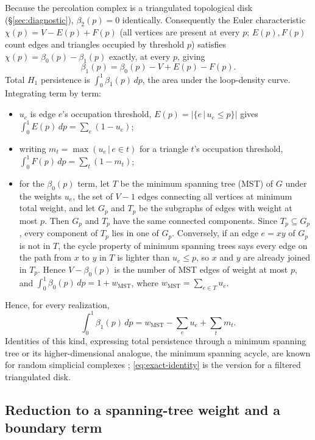 \documentclass[11pt]{article}
\begin{document}
Because the percolation complex is a triangulated topological disk (\S\ref{sec:diagnostic}), $\beta_2(p)=0$ identically. Consequently the Euler characteristic $\chi(p)=V-E(p)+F(p)$ (all vertices are present at every $p$; $E(p),F(p)$ count edges and triangles occupied by threshold $p$) satisfies $\chi(p)=\beta_0(p)-\beta_1(p)$ exactly, at every $p$, giving
\[
\beta_1(p) = \beta_0(p) - V + E(p) - F(p).
\]
Total $H_1$ persistence is $\int_0^1\beta_1(p)\,dp$, the area under the loop-density curve. Integrating term by term:
\begin{itemize}
\item $u_e$ is edge $e$'s occupation threshold, $E(p)=|\{e\,|\,u_e\le p\}|$ gives $\int_0^1E(p)\,dp=\sum_e(1-u_e)$;
\item writing $m_t=\max(u_e\,|\, e\in t)$ for a triangle $t$'s occupation threshold, $\int_0^1F(p)\,dp=\sum_t(1-m_t)$;
\item for the $\beta_0(p)$ term, let $T$ be the minimum spanning tree (MST) of $G$ under the weights $u_e$, the set of $V-1$ edges connecting all vertices at minimum total weight, and let $G_p$ and $T_p$ be the subgraphs of edges with weight at most $p$. Then $G_p$ and $T_p$ have the same connected components. Since $T_p\subseteq G_p$, every component of $T_p$ lies in one of $G_p$. Conversely, if an edge $e=xy$ of $G_p$ is not in $T$, the cycle property of minimum spanning trees says every edge on the path from $x$ to $y$ in $T$ is lighter than $u_e\le p$, so $x$ and $y$ are already joined in $T_p$. Hence $V-\beta_0(p)$ is the number of MST edges of weight at most $p$, and $\int_0^1\beta_0(p)\,dp = 1+w_{\mathrm{MST}}$, where $w_{\mathrm{MST}}=\sum_{e\in T}u_e$.
\end{itemize}
Hence, for every realization,
\begin{equation}
\int_0^1\beta_1(p)\,dp = w_{\mathrm{MST}} - \sum_e u_e + \sum_t m_t.
\label{eq:exact-identity}
\end{equation}
Identities of this kind, expressing total persistence through a minimum spanning tree or its higher-dimensional analogue, the minimum spanning acycle, are known for random simplicial complexes \citep{hiraoka2017,skraba2020}; \eqref{eq:exact-identity} is the version for a filtered triangulated disk.

\subsection{Reduction to a spanning-tree weight and a boundary term}
\label{sec:boundary}
\end{document}
